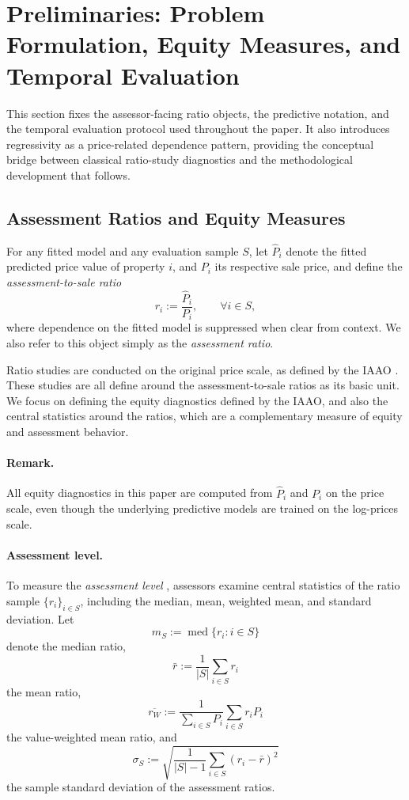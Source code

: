 \documentclass[12pt, draft]{article}
\theoremstyle{plain}
\theoremstyle{definition}
\newcommand{\1}{\mathbf{1}}
\begin{document}
{
\color{blue}
\section{Preliminaries: Problem Formulation, Equity Measures, and Temporal Evaluation}
\label{sec:problem_setting}

This section fixes the assessor-facing ratio objects, the predictive notation, and the temporal evaluation protocol used throughout the paper. It also introduces regressivity as a price-related dependence pattern, providing the conceptual bridge between classical ratio-study diagnostics and the methodological development that follows.

\subsection{Assessment Ratios and Equity Measures}
\label{subsec:equity_metrics}

For any fitted model and any evaluation sample $S$, let $\widehat P_i$ denote the fitted predicted price value of property $i$, and $P_i$ its respective sale price, and define the \emph{assessment-to-sale ratio}
\begin{equation}
\label{eq:ratio_def}
r_i := \frac{\widehat P_i}{P_i},
\qquad \forall i\in S,
\end{equation}
where dependence on the fitted model is suppressed when clear from context. We also refer to this object simply as the \textit{assessment ratio}.

Ratio studies are conducted on the original price scale, as defined by the IAAO \cite{IAAO2025ExposureRatio}. These studies are all define around the assessment-to-sale ratios as its basic unit. We focus on defining the equity diagnostics defined by the IAAO, and also the central statistics around the ratios, which are a complementary measure of equity and assessment behavior. 

\paragraph{Remark.} All equity diagnostics in this paper are computed from $\widehat P_i$ and $P_i$ on the price scale, even though the underlying predictive models are trained on the log-prices scale.

\paragraph{Assessment level.}
To measure the \textit{assessment level} \cite{IAAO2025ExposureRatio}, assessors examine central statistics of the ratio sample $\{r_i\}_{i\in S}$, including the median, mean, weighted mean, and standard deviation. Let
\[
m_S := \operatorname{med}\{r_i: i\in S\}
\]
denote the median ratio,
\[
\bar r := \frac{1}{|S|}\sum_{i\in S} r_i
\]
the mean ratio,
\[
\overline{r_W} := \frac{1}{\sum_{i\in S} P_i}\sum_{i\in S} r_i P_i
\]
the value-weighted mean ratio, and
\[
\sigma_S := \sqrt{\frac{1}{|S|-1}\sum_{i\in S}(r_i-\bar r)^2}
\]
the sample standard deviation of the assessment ratios.

}
\end{document}
